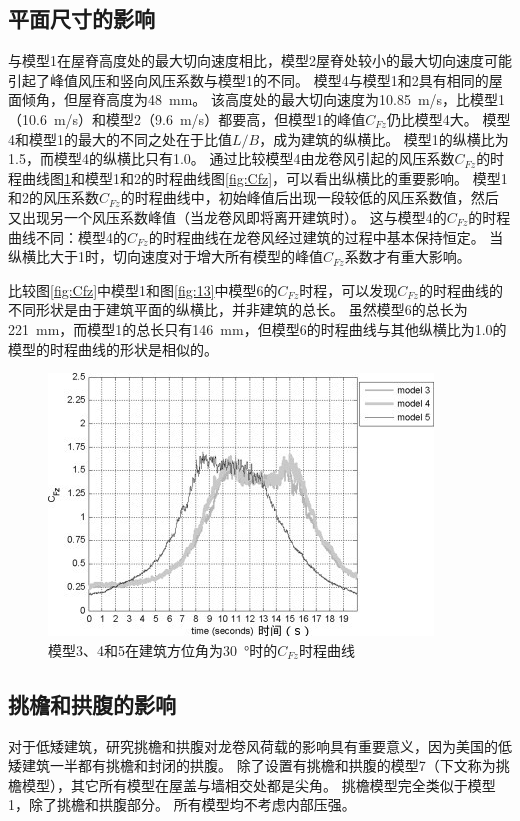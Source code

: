 \documentclass{ctexart}
\begin{document}
\subsection{平面尺寸的影响}
与模型1在屋脊高度处的最大切向速度相比，模型2屋脊处较小的最大切向速度可能引起了峰值风压和竖向风压系数与模型1的不同。
模型4与模型1和2具有相同的屋面倾角，但屋脊高度为\SI{48}{mm}。
该高度处的最大切向速度为\SI{10.85}{m/s}，比模型1（\SI{10.6}{m/s}）和模型2（\SI{9.6}{m/s}）都要高，但模型1的峰值$C_{Fz}$仍比模型4大。
模型4和模型1的最大的不同之处在于比值$L/B$，成为建筑的纵横比。
模型1的纵横比为\num{1.5}，而模型4的纵横比只有\num{1.0}。
通过比较模型4由龙卷风引起的风压系数$C_{Fz}$的时程曲线图\ref{fig:9}和模型1和2的时程曲线图\ref{fig:Cfz}，可以看出纵横比的重要影响。
模型1和2的风压系数$C_{Fz}$的时程曲线中，初始峰值后出现一段较低的风压系数值，然后又出现另一个风压系数峰值（当龙卷风即将离开建筑时）。
这与模型4的$C_{Fz}$的时程曲线不同：模型4的$C_{Fz}$的时程曲线在龙卷风经过建筑的过程中基本保持恒定。
当纵横比大于1时，切向速度对于增大所有模型的峰值$C_{Fz}$系数才有重大影响。

比较图\ref{fig:Cfz}中模型1和图\ref{fig:13}中模型6的$C_{Fz}$时程，可以发现$C_{Fz}$的时程曲线的不同形状是由于建筑平面的纵横比，并非建筑的总长。
虽然模型6的总长为\SI{221}{mm}，而模型1的总长只有\SI{146}{mm}，但模型6的时程曲线与其他纵横比为\num{1.0}的模型的时程曲线的形状是相似的。
\begin{figure}
\centering
\includegraphics[width=0.7\linewidth]{./fig/9.jpg}
\caption{模型3、4和5在建筑方位角为\SI{30}{\degree}时的$C_{Fz}$时程曲线}
\label{fig:9}
\end{figure}

\subsection{挑檐和拱腹的影响}
对于低矮建筑，研究挑檐和拱腹对龙卷风荷载的影响具有重要意义，因为美国的低矮建筑一半都有挑檐和封闭的拱腹。
除了设置有挑檐和拱腹的模型7（下文称为挑檐模型），其它所有模型在屋盖与墙相交处都是尖角。
挑檐模型完全类似于模型1，除了挑檐和拱腹部分。
所有模型均不考虑内部压强。
\end{document}
